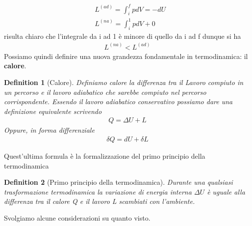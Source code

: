\documentclass[10pt,a4paper]{article}
\newtheorem{definition}{Definition}
\begin{document}
\begin{align*} 
&L^{(ad)} = \int_{i}^{f} p dV = -dU\\
&L^{(na)} = \int_{i}^{1}pdV+0
\end{align*} 
risulta chiaro che l'integrale da i ad 1 è minore di quello da i ad f dunque si ha
\begin{align*} 
	L^{(na)}<L^{(ad)}
\end{align*} 
Possiamo quindi definire una nuova grandezza fondamentale in termodinamica: il \textbf{calore}.
\begin{definition}[Calore]
	Definiamo calore la differenza tra il Lavoro compiuto in un percorso e il lavoro adiabatico che sarebbe compiuto nel percorso corrispondente. Essendo il lavoro adiabatico conservativo possiamo dare una definizione equivalente scrivendo
	\begin{align*} 
		Q = \Delta U + L
	\end{align*} 
	Oppure, in forma differenziale
		\begin{align*} 
		\delta Q = d U + \delta L
	\end{align*} 
\end{definition}
Quest'ultima formula è la formalizzazione del primo principio della termodinamica
\begin{definition}[Primo principio della termodinamica]
	Durante una qualsiasi trasformazione termodinamica la variazione di energia interna $\Delta U$ è uguale alla differenza tra il calore Q e il lavoro L scambiati con l'ambiente. 
\end{definition}
Svolgiamo alcune considerazioni su quanto visto.
\end{document}

